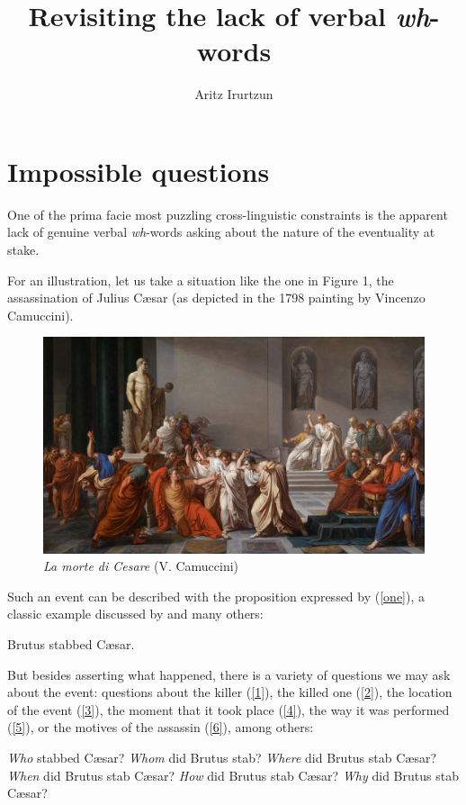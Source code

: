 \documentclass[output=paper]{langsci/langscibook}
\author{Aritz Irurtzun\affiliation{CNRS-IKER (UMR 5478)}}
\title{Revisiting the lack of verbal \textit{wh}-words}
\begin{document}
\glsresetall

\section{Impossible questions}

One of the prima facie most puzzling cross-linguistic constraints is the
apparent lack of genuine verbal \emph{wh}-words asking about the nature of the
eventuality at stake.

For an illustration, let us take a situation like the one in Figure 1, the
assassination of Julius C\ae{}sar (as depicted in the 1798 painting by Vincenzo
Camuccini).

\begin{figure}[H]
\centering
\includegraphics[width=.8\textwidth,keepaspectratio=true]{./img/15.png}
\caption{\emph{La morte di Cesare} (V. Camuccini)}
\end{figure}

Such an event can be described with the proposition expressed by (\ref{one}), a
classic example discussed by \citet{Davidson1967} and many others:

\begin{exe}
\ex \label{one} Brutus stabbed C\ae{}sar.
\end{exe}

But besides asserting what happened, there is a variety of questions we may ask
about the event: questions about the killer (\ref{1}), the killed one
(\ref{2}), the location of the event (\ref{3}), the moment that it took place
(\ref{4}), the way it was performed (\ref{5}), or the motives of the assassin
(\ref{6}), among others:

\begin{exe}
\ex \label{1} \emph{Who} stabbed C\ae{}sar?
\ex \label{2} \emph{Whom} did Brutus stab?
\ex \label{3} \emph{Where} did Brutus stab C\ae{}sar?
\ex \label{4} \emph{When} did Brutus stab C\ae{}sar?
\ex \label{5} \emph{How} did Brutus stab C\ae{}sar?
\ex \label{6} \emph{Why} did Brutus stab C\ae{}sar?
\end{exe}
\end{document}
